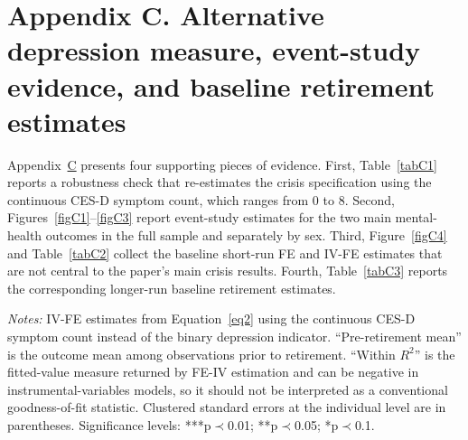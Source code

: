 \documentclass[arguments, manuscript, 11pt]{aastex631}
\begin{document}
\newpage
{}
\FloatBarrier
\section*{Appendix C. Alternative depression measure, event-study evidence, and baseline retirement estimates} \label{sec:appendixC}
\setcounter{table}{0}
\renewcommand{\thetable}{C\arabic{table}}
\setcounter{figure}{0}
\renewcommand{\thefigure}{C\arabic{figure}}

Appendix~\hyperref[sec:appendixC]{C} presents four supporting pieces of evidence. First, Table~\ref{tabC1} reports a robustness check that re-estimates the crisis specification using the continuous CES-D symptom count, which ranges from 0 to 8. Second, Figures~\ref{figC1}--\ref{figC3} report event-study estimates for the two main mental-health outcomes in the full sample and separately by sex. Third, Figure~\ref{figC4} and Table~\ref{tabC2} collect the baseline short-run FE and IV-FE estimates that are not central to the paper's main crisis results. Fourth, Table~\ref{tabC3} reports the corresponding longer-run baseline retirement estimates.

\begin{table}[h]
\centering
\caption{Robustness check: continuous CES-D symptom count as an alternative depression measure}
\label{tabC1}
\tiny{{\singlespacing \emph{Notes:} IV-FE estimates from Equation~\ref{eq2} using the continuous CES-D symptom count instead of the binary depression indicator. ``Pre-retirement mean'' is the outcome mean among observations prior to retirement. ``Within $R^2$'' is the fitted-value measure returned by FE-IV estimation and can be negative in instrumental-variables models, so it should not be interpreted as a conventional goodness-of-fit statistic. Clustered standard errors at the individual level are in parentheses. Significance levels: ***p$\prec$0.01; **p$\prec$0.05; *p$\prec$0.1.}}
\end{table}
\end{document}
